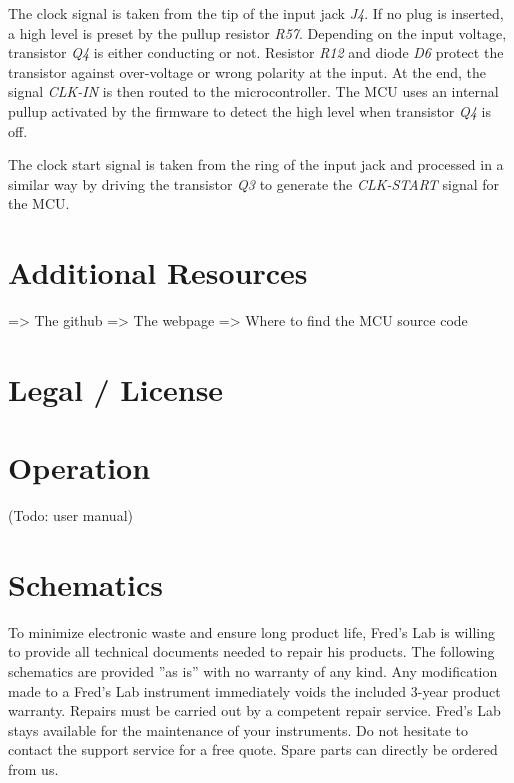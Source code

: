 \documentclass{scrartcl}
\begin{document}
The clock signal is taken from the tip of the input jack \emph{J4}. If no plug is inserted, a high level is preset by the pullup resistor \emph{R57}. Depending on the input voltage, transistor \emph{Q4} is either conducting or not. Resistor \emph{R12} and diode \emph{D6} protect the transistor against over-voltage or wrong polarity at the input. At the end, the signal \emph{CLK-IN} is then routed to the microcontroller. The MCU uses an internal pullup activated by the firmware to detect the high level when transistor \emph{Q4} is off.

The clock start signal is taken from the ring of the input jack and processed in a similar way by driving the transistor \emph{Q3} to generate the \emph{CLK-START} signal for the MCU.

\pagebreak


\section{Additional Resources}

=> The github
=> The webpage
=> Where to find the MCU source code

\pagebreak


\section{Legal / License}

\pagebreak


\section{Operation}

 (Todo: user manual)


\section{Schematics}

To minimize electronic waste and ensure long product life, Fred’s Lab is willing to provide all technical documents needed to repair his products. The following schematics are provided ”as is” with no warranty of any kind. Any modification made to a Fred’s Lab instrument immediately voids the included 3-year product warranty. Repairs must be carried out by a competent repair service. Fred’s Lab stays available for the maintenance of your instruments. Do not hesitate to contact the support service for a free quote. Spare parts can directly be ordered from us.
\end{document}
